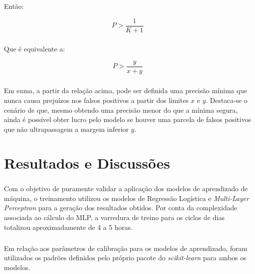 \documentclass[grad,numbers]{coppe}
\begin{document}
                \paragraph{}Então:
                
                \begin{equation}
                    P > \frac{1}{K + 1}
                \end{equation}
                
                \paragraph{}Que é equivalente a:
                
                \begin{equation}\label{eq:precisao-minima}
                    P > \frac{y}{x + y}
                \end{equation}
                
                \paragraph{}Em suma, a partir da relação acima, pode ser definida uma precisão mínima que nunca causa prejuízos nos falsos positivos a partir dos limites $x$ e $y$. Destaca-se o cenário de que, mesmo obtendo uma precisão menor do que a mínima segura, ainda é possível obter lucro pelo modelo se houver uma parcela de falsos positivos que não ultrapassagem a margem inferior $y$.
                
                
                
    \chapter{Resultados e Discussões}
    
        \paragraph{}Com o objetivo de puramente validar a aplicação dos modelos de aprendizado de máquina, o treinamento utilizou os modelos de Regressão Logística e \textit{Multi-Layer Perceptron} para a geração dos resultados obtidos. Por conta da complexidade associada ao cálculo do MLP, a varredura de treino para os ciclos de dias totalizou aproximadamente de 4 a 5 horas.
        
        \paragraph{}Em relação aos parâmetros de calibração para os modelos de aprendizado, foram utilizados os padrões definidos pelo próprio pacote do \textit{scikit-learn} \cite{scikit-learn} para ambos os modelos. 
    
\end{document}
